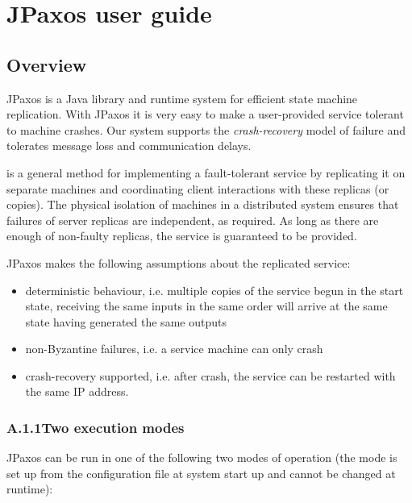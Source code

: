 \chapter{JPaxos user guide}

\section{Overview}
\label{overview:overview}\label{overview::doc}\label{overview:jpaxos-user-guide}
JPaxos is a Java library and runtime system for efficient state machine
replication. \linebreak With JPaxos it is very easy to make a user-provided
service tolerant to machine crashes. Our system supports the \emph{crash-recovery}
model of failure and tolerates message loss and communication delays.
\begin{description}
\item[{\href{http://en.wikipedia.org/wiki/State\_machine\_replication}{State machine replication}}] \leavevmode{}\label{overview:term-state-machine-replication}
is a general method for implementing a fault-tolerant service by
replicating it on separate machines and coordinating client interactions
with these replicas (or copies). The physical isolation of machines in
a distributed system ensures that failures of server replicas are
independent, as required. \linebreak As long as there are enough of non-faulty
replicas, the service is guaranteed to be provided.

\end{description}

JPaxos makes the following assumptions about the replicated service:
\begin{itemize}
\item {} 
deterministic behaviour, i.e. multiple copies of the service begun in
the start state, receiving the same inputs in the same order will
arrive at the same state having generated the same outputs

\item {} 
non-Byzantine failures, i.e. a service machine can only crash

\item {} 
crash-recovery supported, i.e. after crash, the service can be restarted
with the same IP address.

\end{itemize}


\subsection*{A.1.1\quad Two execution modes}
\label{overview:two-execution-modes}
JPaxos can be run in one of the following two modes of operation
(the mode is set up from the configuration file at system start up
and cannot be changed at runtime):

